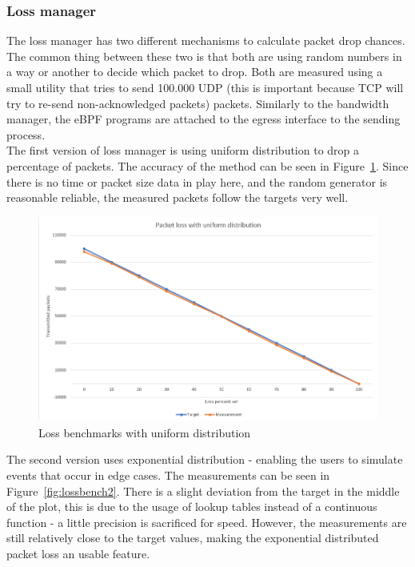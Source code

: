 \subsubsection{Loss manager}
The loss manager has two different mechanisms to calculate packet drop chances. The common thing between these two is that both are using random numbers in a way or another to decide which packet to drop. Both are measured using a small utility that tries to send 100.000 UDP (this is important because TCP will try to re-send non-acknowledged packets) packets. Similarly to the bandwidth manager, the eBPF programs are attached to the egress interface to the sending process. \\

The first version of loss manager is using uniform distribution to drop a percentage of packets. The accuracy of the method can be seen in Figure~\ref{fig:lossbench1}. Since there is no time or packet size data in play here, and the random generator is reasonable reliable, the measured packets follow the targets very well.

\begin{figure}[H]
	\centering
	\includegraphics[width=\textwidth]{images/loss1.png}
	\caption{Loss benchmarks with uniform distribution}
	\label{fig:lossbench1}
\end{figure}

The second version uses exponential distribution - enabling the users to simulate events that occur in edge cases. The measurements can be seen in Figure~\ref{fig:lossbench2}. There is a slight deviation from the target in the middle of the plot, this is due to the usage of lookup tables instead of a continuous function - a little precision is sacrificed for speed. However, the measurements are still relatively close to the target values, making the exponential distributed packet loss an usable feature.

